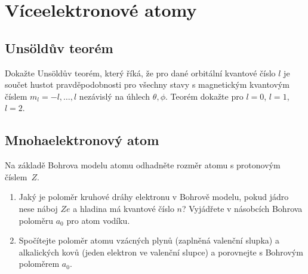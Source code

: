 \section{Víceelektronové atomy}
\subsection{Unsöldův teorém}
    Dokažte Unsöldův teorém, který říká, že pro dané orbitální kvantové číslo $l$ je součet hustot pravděpodobnosti pro všechny stavy s magnetickým kvantovým číslem $m_l=-l,\dotsc,l$ nezávislý na úhlech $\theta,\phi$.
    Teorém dokažte pro $l=0$, $l=1$, $l=2$.

\subsection{Mnohaelektronový atom}
    Na základě Bohrova modelu atomu odhadněte rozměr atomu s protonovým číslem~$Z$.

    \begin{enumerate}
        \item
            Jaký je poloměr kruhové dráhy elektronu v Bohrově modelu, pokud jádro nese náboj $Ze$ a hladina má kvantové číslo $n$?
            Vyjádřete v násobcích Bohrova poloměru $a_{0}$ pro atom vodíku.

        \item
            Spočítejte poloměr atomu vzácných plynů (zaplněná valenční slupka) a alkalických kovů (jeden elektron ve valenční slupce) a porovnejte s Bohrovým poloměrem $a_{0}$.
    \end{enumerate}

